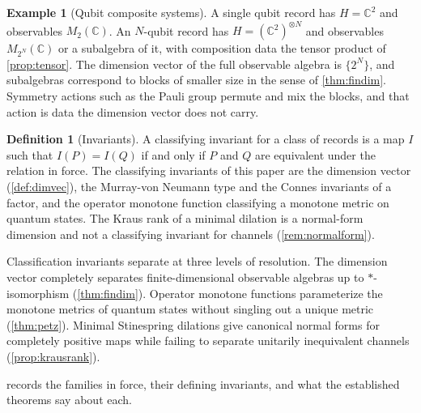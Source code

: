 \documentclass[11pt,letterpaper]{article}
\theoremstyle{definition}
\newtheorem{definition}[theorem]{Definition}
\newtheorem{example}[theorem]{Example}
\theoremstyle{remark}
\begin{document}
\begin{example}[Qubit composite systems]
\label{ex:qubits}
A single qubit record has $H = \mathbb{C}^2$ and observables $M_2(\mathbb{C})$. An $N$-qubit record has $H = (\mathbb{C}^2)^{\otimes N}$ and observables $M_{2^N}(\mathbb{C})$ or a subalgebra of it, with composition data the tensor product of \cref{prop:tensor}. The dimension vector of the full observable algebra is $\{2^N\}$, and subalgebras correspond to blocks of smaller size in the sense of \cref{thm:findim}. Symmetry actions such as the Pauli group permute and mix the blocks, and that action is data the dimension vector does not carry.
\end{example}

\begin{definition}[Invariants]
\label{def:invariants}
A classifying invariant for a class of records is a map $I$ such that $I(P) = I(Q)$ if and only if $P$ and $Q$ are equivalent under the relation in force. The classifying invariants of this paper are the dimension vector (\cref{def:dimvec}), the Murray-von Neumann type and the Connes invariants of a factor, and the operator monotone function classifying a monotone metric on quantum states. The Kraus rank of a minimal dilation is a normal-form dimension and not a classifying invariant for channels (\cref{rem:normalform}).
\end{definition}

Classification invariants separate at three levels of resolution. The dimension vector completely separates finite-dimensional observable algebras up to $*$-isomorphism (\cref{thm:findim}). Operator monotone functions parameterize the monotone metrics of quantum states without singling out a unique metric (\cref{thm:petz}). Minimal Stinespring dilations give canonical normal forms for completely positive maps while failing to separate unitarily inequivalent channels (\cref{prop:krausrank}).

 records the families in force, their defining invariants, and what the established theorems say about each.
\end{document}
